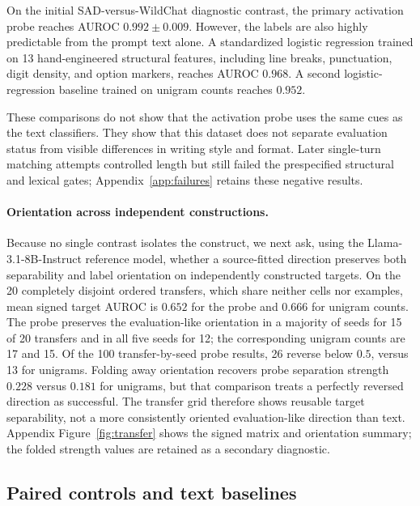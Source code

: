 \documentclass{article}
\begin{document}
On the initial SAD-versus-WildChat diagnostic contrast, the primary
activation probe reaches AUROC $0.992\mathbin{\pm}0.009$. However, the labels
are also highly predictable from the prompt text alone. A standardized logistic
regression trained on 13 hand-engineered structural features, including line
breaks, punctuation, digit density, and option markers, reaches AUROC $0.968$.
A second logistic-regression baseline trained on unigram counts reaches
$0.952$.

These comparisons do not show that the activation probe uses the same cues as
the text classifiers. They show that this dataset does not separate evaluation
status from visible differences in writing style and format. Later single-turn
matching attempts controlled length but still failed the prespecified
structural and lexical gates; Appendix~\ref{app:failures} retains these negative
results.

\paragraph{Orientation across independent constructions.}

Because no single contrast isolates the construct, we next ask, using the
Llama-3.1-8B-Instruct reference model, whether a source-fitted direction
preserves both separability and label orientation on
independently constructed targets. On the 20 completely disjoint ordered
transfers, which share neither cells nor examples, mean signed target AUROC is
$0.652$ for the probe and $0.666$ for unigram counts. The probe preserves the
evaluation-like orientation in a majority of seeds for 15 of 20 transfers and
in all five seeds for 12; the corresponding unigram counts are 17 and 15. Of
the 100 transfer-by-seed probe results, 26 reverse below $0.5$, versus 13 for
unigrams. Folding away orientation recovers probe separation strength $0.228$
versus $0.181$ for unigrams, but that comparison treats a perfectly reversed
direction as successful. The transfer grid therefore shows reusable target
separability, not a more consistently oriented evaluation-like direction than
text. Appendix Figure~\ref{fig:transfer} shows the signed matrix and orientation
summary; the folded strength values are retained as a secondary
diagnostic.

\subsection{Paired controls and text baselines}
\end{document}
